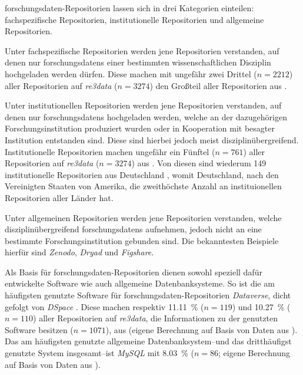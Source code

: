 \gls{forschungsdaten}-Repositorien lassen sich in drei Kategorien einteilen:
fachspezifische Repositorien, institutionelle Repositorien und allgemeine Repositorien.

Unter fachspezifische Repositorien werden jene Repositorien verstanden, auf denen nur \glspl{forschungsdaten} einer bestimmten wissenschaftlichen Disziplin hochgeladen werden dürfen.
Diese machen mit ungefähr zwei Drittel ($n=\num{2212}$) aller Repositorien auf \textit{re3data} ($n=\num{3274}$) den Großteil aller Repositorien aus \autocite{Khan2024}.

Unter institutionellen Repositorien werden jene Repositorien verstanden, auf denen nur \glspl{forschungsdaten} hochgeladen werden, welche an der dazugehörigen Forschungsinstitution produziert wurden oder in Kooperation mit besagter Institution entstanden sind.
Diese sind hierbei jedoch meist disziplinübergreifend.
Institutionelle Repositorien machen ungefähr ein Fünftel ($n=\num{761}$) aller Repositorien auf \textit{re3data}  ($n=\num{3274}$) aus \autocite{Khan2024}.
Von diesen sind wiederum \num{149} institutionelle Repositorien aus Deutschland \autocite{re3data-institutional}, womit Deutschland, nach den Vereinigten Staaten von Amerika, die zweithöchste Anzahl an instituionellen Repositorien aller Länder hat.

Unter allgemeinen Repositorien werden jene Repositorien verstanden, welche disziplinübergreifend \glspl{forschungsdaten} aufnehmen, jedoch nicht an eine bestimmte Forschungsinstitution gebunden sind.
Die bekanntesten Beispiele hierfür sind \textit{Zenodo}, \textit{Dryad} und \textit{Figshare}.

Als Basis für \gls{forschungsdaten}-Repositorien dienen sowohl speziell dafür entwickelte Software wie auch allgemeine Datenbanksysteme.
So ist die am häufigsten genutzte Software für \gls{forschungsdaten}-Repositorien \textit{Dataverse}, dicht gefolgt von \textit{DSpace} \autocite{Khan2024}.
Diese machen respektiv \SI{11.11}{\percent} ($n=\num{119}$) und \SI{10.27}{\percent} ($n=\num{110}$) aller Repositorien auf \textit{re3data}, die Informationen zu der genutzten Software besitzen ($n=\num{1071}$), aus (eigene Berechnung auf Basis von Daten aus \autocite{Khan2024}).
Das am häufigsten genutzte allgemeine Datenbanksystem--und das dritthäufigst genutzte System insgesamt--ist \textit{MySQL} mit \SI{8.03}{\percent} ($n=\num{86}$; eigene Berechnung auf Basis von Daten aus \autocite{Khan2024}).

